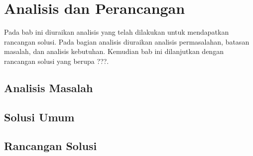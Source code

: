 \chapter{Analisis dan Perancangan}

Pada bab ini diuraikan analisis yang telah dilakukan untuk mendapatkan rancangan solusi.
Pada bagian analisis diuraikan analisis permasalahan, batasan masalah, dan analisis kebutuhan.
Kemudian bab ini dilanjutkan dengan rancangan solusi yang berupa ???.

\section{Analisis Masalah}

\section{Solusi Umum}

\section{Rancangan Solusi}